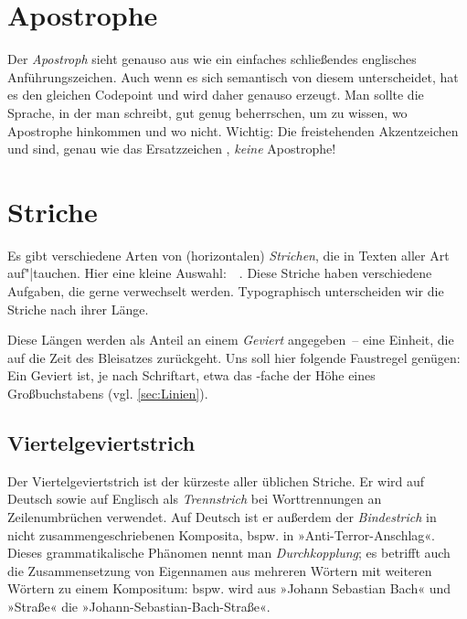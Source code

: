 \section{Apostrophe}

Der \emph{Apostroph}  sieht genauso aus wie ein einfaches schließendes
englisches Anführungszeichen. Auch wenn es sich semantisch von diesem
unterscheidet, hat es den gleichen Codepoint und wird daher genauso erzeugt.
Man sollte die Sprache, in der man schreibt, gut genug beherrschen, um zu
wissen, wo Apostrophe hinkommen und wo nicht.  Wichtig: Die freistehenden
Akzentzeichen \Char{\textasciigrave} und  sind, genau wie das
Ersatzzeichen \Char{\textquotesingle}, \emph{keine} Apostrophe!

\section{Striche}
\label{sec:Striche}

Es gibt verschiedene Arten von (horizontalen) \emph{Strichen}, die in Texten
aller Art auf"|tauchen.  Hier eine kleine Auswahl:
\Char{-}\,\Char{--}\,\Char{---}\,\Char{$-$}\,\Char{$=$}.  Diese Striche haben
verschiedene Aufgaben, die gerne verwechselt werden.  Typographisch
unterscheiden wir die Striche nach ihrer Länge.

Diese Längen werden als Anteil an einem \emph{Geviert} angegeben~--
eine Einheit, die auf die Zeit des Bleisatzes zurückgeht.  Uns soll
hier folgende Faustregel genügen: Ein Geviert ist, je nach Schriftart,
etwa das -fache der Höhe eines Großbuchstabens
(vgl. \cref{sec:Linien}).

\subsection{Viertelgeviertstrich}
\label{subsec:Viertel}

Der Viertelgeviertstrich \Char{-} ist der kürzeste aller üblichen
Striche.  Er wird auf Deutsch sowie auf Englisch als \emph{Trennstrich} bei
Worttrennungen an Zeilenumbrüchen verwendet.  Auf Deutsch ist er außerdem der
\emph{Bindestrich} in nicht zusammenge\-schriebenen Komposita, bspw. in
»Anti-Terror-Anschlag«.  Dieses grammatikalische Phänomen nennt man
\emph{Durchkopplung}; es betrifft auch die Zusammensetzung von Eigennamen aus
mehreren Wörtern mit weiteren Wörtern zu einem Kompositum: bspw. wird aus
»Johann Sebastian Bach« und »Straße« die »Johann-Sebastian-Bach-Straße«.

